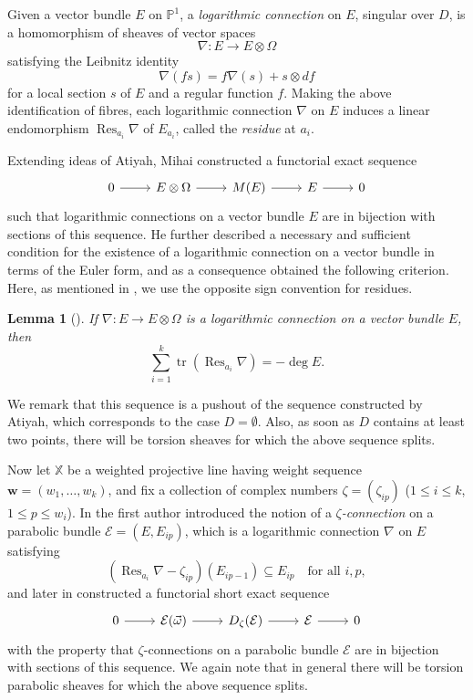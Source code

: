\documentclass[12pt,a4paper]{amsart}
\theoremstyle{plain}
\newtheorem{lem}[thm]{Lemma}
\newcommand{\PP}{\mathbb P}
\DeclareMathOperator{\tr}{tr}
\DeclareMathOperator{\Res}{Res}
\newcommand{\E}{\mathcal E}
\newcommand{\XX}{\mathbb X}
\newcommand{\oom}{\vec{\omega}}
\newcommand{\bw}{\mathbf w}
\begin{document}
Given a vector bundle $E$ on $\PP^1$, a \emph{logarithmic connection} on $E$, singular over $D$, is a homomorphism of sheaves of vector spaces
\[ 
\nabla \colon E\to E\otimes \Omega 
\]
satisfying the Leibnitz identity
\[ 
\nabla(fs) = f\nabla(s) + s\otimes df 
\]
for a local section $s$ of $E$ and a regular function $f$. Making the above identification of fibres, each logarithmic connection $\nabla$ on $E$ induces a linear endomorphism $\Res_{a_i}\nabla$ of $E_{a_i}$, called the \emph{residue} at $a_i$.

Extending ideas of Atiyah, Mihai constructed a functorial exact sequence
\[ \begin{tikzcd}
0 \arrow[r] & E\otimes\Omega \arrow[r] & M(E) \arrow[r] & E \arrow[r] & 0
\end{tikzcd}\]
such that logarithmic connections on a vector bundle $E$ are in bijection with sections of this sequence. He further described a necessary and sufficient condition for the existence of a logarithmic connection on a vector bundle in terms of the Euler form, and as a consequence obtained the following criterion. Here, as mentioned in \cite[\S7]{CBipb}, we use the opposite sign convention for residues.

\begin{lem}[{\cite[Corollaire 3]{Mihai}}]
\label{l:conntrace}
If $\nabla\colon E\to E\otimes \Omega$ is a logarithmic connection on a vector bundle $E$, then
\[ \sum_{i=1}^k \tr(\Res_{a_i} \nabla) = -\deg E. \]
\end{lem}

We remark that this sequence is a pushout of the sequence constructed by Atiyah, which corresponds to the case $D=\emptyset$. Also, as soon as $D$ contains at least two points, there will be torsion sheaves for which the above sequence splits.

Now let $\XX$ be a weighted projective line having weight sequence $\bw = (w_1,\dots,w_k)$, and fix a collection of complex numbers $\zeta = (\zeta_{ip})$ ($1\le i\le k$, $1\le p\le w_i$). In \cite{CBipb} the first author introduced the notion of a \emph{$\zeta$-connection} on a parabolic bundle $\E=(E,E_{ip})$, which is a logarithmic connection $\nabla$ on $E$ satisfying
\[ (\Res_{a_i}\nabla-\zeta_{ip})(E_{ip-1}) \subseteq E_{ip} \quad\textrm{for all }i,p, \]
and later in \cite{CBcw} constructed a functorial short exact sequence
\[ \begin{tikzcd}
0 \arrow[r] & \E(\oom)\arrow[r] & D_\zeta(\E)\arrow[r] & \E \arrow[r] & 0
\end{tikzcd} \]
with the property that $\zeta$-connections on a parabolic bundle $\E$ are in bijection with sections of this sequence. We again note that in general there will be torsion parabolic sheaves for which the above sequence splits.
\end{document}
